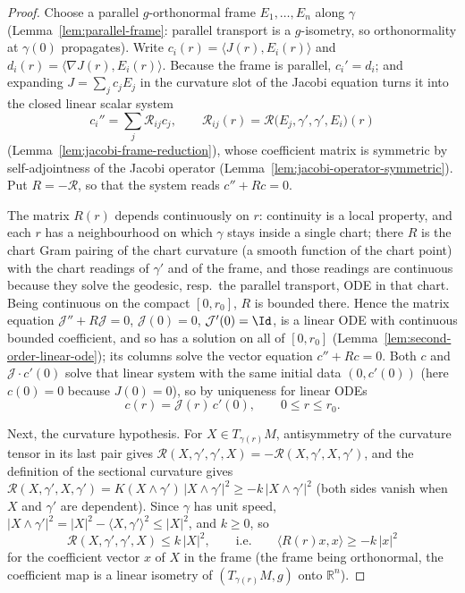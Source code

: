 \begin{proof}
\leanok
Choose a parallel $g$-orthonormal frame $E_1,\ldots,E_n$ along $\gamma$
(Lemma~\ref{lem:parallel-frame}: parallel transport is a $g$-isometry, so
orthonormality at $\gamma(0)$ propagates). Write $c_i(r)=\langle
J(r),E_i(r)\rangle$ and $d_i(r)=\langle\nabla J(r),E_i(r)\rangle$. Because the
frame is parallel, $c_i'=d_i$; and expanding $J=\sum_j c_jE_j$ in the curvature
slot of the Jacobi equation turns it into the closed linear scalar system
$$c_i''=\sum_j\mathcal R_{ij}c_j,\qquad
\mathcal R_{ij}(r)={\mathcal R}\big(E_j,\gamma',\gamma',E_i\big)(r)$$
(Lemma~\ref{lem:jacobi-frame-reduction}), whose coefficient matrix is symmetric
by self-adjointness of the Jacobi operator
(Lemma~\ref{lem:jacobi-operator-symmetric}). Put $R=-\mathcal R$, so that the
system reads $c''+Rc=0$.

The matrix $R(r)$ depends continuously on $r$: continuity is a local property,
and each $r$ has a neighbourhood on which $\gamma$ stays inside a single chart;
there $R$ is the chart Gram pairing of the chart curvature (a smooth function of
the chart point) with the chart readings of $\gamma'$ and of the frame, and those
readings are continuous because they solve the geodesic, resp.\ the parallel
transport, ODE in that chart. Being continuous on the compact $[0,r_0]$, $R$ is
bounded there. Hence the matrix equation $\mathcal J''+R\mathcal J=0$,
$\mathcal J(0)=0$, $\mathcal J'(0)=\Id$, is a linear ODE with continuous bounded
coefficient, and so has a solution on all of $[0,r_0]$
(Lemma~\ref{lem:second-order-linear-ode}); its columns solve the vector equation
$c''+Rc=0$. Both $c$ and $\mathcal J\cdot c'(0)$ solve that linear system with
the same initial data $(0,c'(0))$ (here $c(0)=0$ because $J(0)=0$), so by
uniqueness for linear ODEs
$$c(r)=\mathcal J(r)\,c'(0),\qquad 0\le r\le r_0 .$$

Next, the curvature hypothesis. For $X\in T_{\gamma(r)}M$, antisymmetry of the
curvature tensor in its last pair gives
${\mathcal R}(X,\gamma',\gamma',X)=-{\mathcal R}(X,\gamma',X,\gamma')$, and the
definition of the sectional curvature gives
${\mathcal R}(X,\gamma',X,\gamma')=K(X\wedge\gamma')\,|X\wedge\gamma'|^2\ge
-k\,|X\wedge\gamma'|^2$ (both sides vanish when $X$ and $\gamma'$ are dependent).
Since $\gamma$ has unit speed, $|X\wedge\gamma'|^2=|X|^2-\langle
X,\gamma'\rangle^2\le|X|^2$, and $k\ge0$, so
$${\mathcal R}(X,\gamma',\gamma',X)\le k\,|X|^2,\qquad\text{i.e.}\qquad
\langle R(r)x,x\rangle\ge -k\,|x|^2$$
for the coefficient vector $x$ of $X$ in the frame (the frame being orthonormal,
the coefficient map is a linear isometry of $(T_{\gamma(r)}M,g)$ onto
$\mathbb R^n$).


\end{proof}
